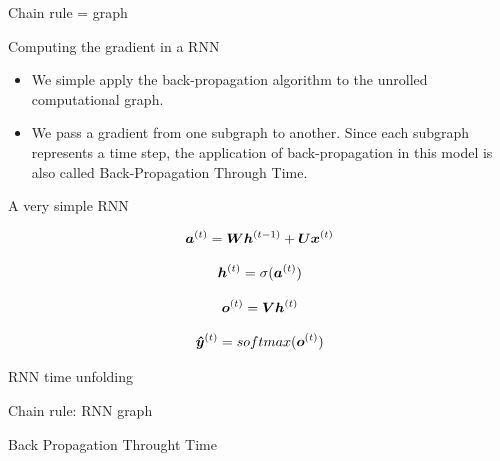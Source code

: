 \documentclass[10pt]{beamer}
\begin{document}
\begin{frame}{Chain rule = graph}

\end{frame}

\begin{frame}{Computing the gradient in a RNN}
\begin{itemize}
\item [] We simple apply the back-propagation algorithm to the unrolled computational graph.
\item [] We pass a gradient from one subgraph to another. Since each subgraph represents a time step, the application of back-propagation in this model is also called \alert{Back-Propagation Through Time}.
\end{itemize}
\end{frame}


\begin{frame}{A very simple RNN}

\Large{
\begin{equation*}
\bm{a}^{(t)} = \bm{W} \bm{h}^{(t-1)} + \bm{U} \bm{x}^{(t)}
\end{equation*}

\vspace{0.1cm}

\begin{equation*}
\bm{h}^{(t)} = \sigma(\bm{a}^{(t)})
\end{equation*}

\vspace{0.1cm}

\begin{equation*}
\bm{o}^{(t)} = \bm{V} \bm{h}^{(t)}
\end{equation*}

\vspace{0.1cm}

\begin{equation*}
\bm{\hat{y}}^{(t)} = softmax(\bm{o}^{(t)})
\end{equation*}
}

\end{frame}


\begin{frame}{RNN time unfolding}

\end{frame}

\begin{frame}{Chain rule: RNN graph}

\end{frame}

\begin{frame}{Back Propagation Throught Time}

\end{frame}
\end{document}
